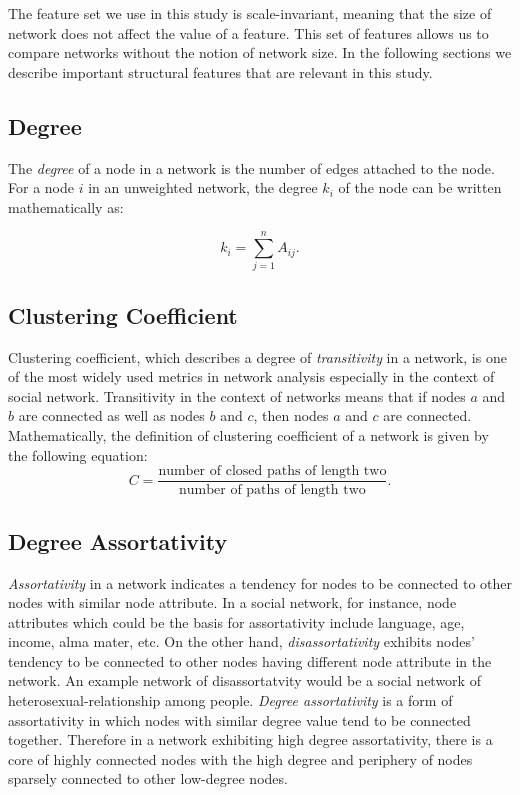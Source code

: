	The feature set we use in this study is scale-invariant, meaning that the size of network does not affect the value of a feature. This set of features allows us to compare networks without the notion of network size. In the following sections we describe important structural features that are relevant in this study.	
	 
	\subsection{Degree}
	The \textit{degree} of a node in a network is the number of edges attached to the node. For a node $i$ in an unweighted network, the degree $k_i$ of the node can be written mathematically as:
	
	\begin{equation}
 	 k_i = \sum_{j = 1}^n A_{ij}.
	\end{equation}

	
	\subsection{Clustering Coefficient}
	Clustering coefficient, which describes a degree of \textit{transitivity} in a network, is one of the most widely used metrics in network analysis especially in the context of social network. Transitivity in the context of networks means that if nodes $a$ and $b$ are connected as well as nodes $b$ and $c$, then nodes $a$ and $c$ are connected. Mathematically, the definition of clustering coefficient of a network is given by the following equation:
	\begin{equation}
	C = \frac{\text{number of closed paths of length two}}{\text{number of paths of length two}}.
	\end{equation}
	
	\subsection{Degree Assortativity}
	\textit{Assortativity} in a network indicates a tendency for nodes to be connected to other nodes with similar node attribute. In a social network, for instance, node attributes which could be the basis for assortativity include language, age, income, alma mater, etc. On the other hand, \textit{disassortativity} exhibits nodes' tendency to be connected to other nodes having different node attribute in the network. An example network of disassortatvity would be a social network of heterosexual-relationship among people. 
	\textit{Degree assortativity} is a form of assortativity in which nodes with similar degree value tend to be connected together. Therefore in a network exhibiting high degree assortativity, there is a core of highly connected nodes with the high degree and periphery of nodes sparsely connected to other low-degree nodes.
	
